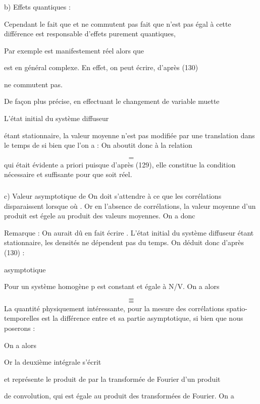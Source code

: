\subsubsection{}%
b) Effets quantiques :

Cependant le fait que  et  ne commutent pas fait que
 n'est pas égal à cette différence est responsable d'effets
purement quantiques,

Par exemple  est manifestement réel alors que 

est en général complexe. En effet, on peut écrire, d'après (130)

 ne commutent pas.

De façon plus précise, en effectuant le changement de variable muette


L'état initial du système diffuseur

étant stationnaire, la valeur moyenne  n'est pas modifiée par une
translation dans le temps de  si bien que l'on a :
On aboutit donc à la relation

\[
\tag{142}=
\]
qui était évidente a priori puisque d'après (129), elle constitue la condition
nécessaire et suffisante pour que  soit réel.
\subsubsection{}%
c) Valeur asymptotique de 
On doit s'attendre à ce que les corrélations disparaissent
lorsque  où . Or en l'absence de corrélations, la valeur
moyenne d'un produit est égele au produit des valeurs moyennes. On a donc

Remarque : On aurait dû en fait écrire . L'état initial du
système diffuseur étant stationnaire, les densités ne dépendent pas du temps.
On déduit donc d'après (130) :

asymptotique

Pour un système homogène p est constant et égale à N/V.
On a alors

\[
\tag{144}=
\]
\[
\tag{145}=
\]
La quantité physiquement intéressante, pour la mesure des corrélations
spatio-temporelles est la différence entre  et sa partie asymptotique, si bien que nous poserons :

On a alors

Or la deuxième intégrale s'écrit

et représente le produit de  par la transformée de Fourier d'un produit

de convolution, qui est égale au produit des transformées de Fourier. On a

